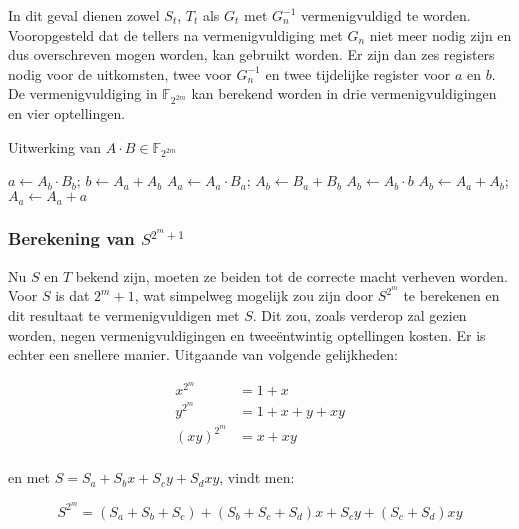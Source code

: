 In dit geval dienen zowel $S_t$, $T_t$ als $G_t$ met $G_n^{-1}$ vermenigvuldigd te worden. Vooropgesteld dat de tellers na vermenigvuldiging met $G_n$ niet meer nodig zijn en dus overschreven mogen worden, kan  gebruikt worden. Er zijn dan zes registers nodig voor de uitkomsten, twee voor $G_n^{-1}$ en twee tijdelijke register voor $a$ en $b$. De vermenigvuldiging in $\mathbb{F}_{2^{2m}}$ kan berekend worden in drie vermenigvuldigingen en vier optellingen.

\begin{algorithm}[h]
	\caption{Uitwerking van $A \cdot B \in \mathbb{F}_{2^{2m}}$}
	\label{algoritme-implementatie-miller-f2m-mult}
	$a \leftarrow A_b \cdot B_b$; $b \leftarrow A_a + A_b$\;
	$A_a \leftarrow A_a \cdot B_a$; $A_b \leftarrow B_a + B_b$\;
	$A_b \leftarrow A_b \cdot b$\;
	$A_b \leftarrow A_a + A_b$; $A_a \leftarrow A_a + a$\;
\end{algorithm}

\subsubsection{Berekening van $S^{2^m + 1}$}

Nu $S$ en $T$ bekend zijn, moeten ze beiden tot de correcte macht verheven worden. Voor $S$ is dat $2^m + 1$, wat simpelweg mogelijk zou zijn door $S^{2^m}$ te berekenen en dit resultaat te vermenigvuldigen met $S$. Dit zou, zoals verderop zal gezien worden, negen vermenigvuldigingen en twee\"entwintig optellingen kosten. Er is echter een snellere manier. Uitgaande van volgende gelijkheden:

\[\begin{aligned}
x^{2^m}	&= 1 + x\\
y^{2^m}	&= 1 + x + y + xy\\
(xy)^{2^m}	&= x + xy\\
\end{aligned}\]

en met $S = S_a + S_b x + S_c y + S_d xy$, vindt men:

\[S^{2^m} = (S_a + S_b + S_c) + (S_b + S_c + S_d) x + S_c y + (S_c + S_d) xy\]

